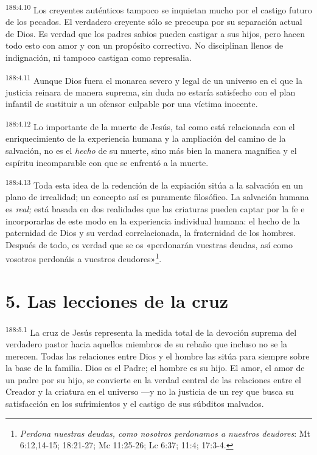 \par 
\textsuperscript{188:4.10} Los creyentes auténticos tampoco se inquietan mucho por el castigo futuro de los pecados. El verdadero creyente sólo se preocupa por su separación actual de Dios. Es verdad que los padres sabios pueden castigar a sus hijos, pero hacen todo esto con amor y con un propósito correctivo. No disciplinan llenos de indignación, ni tampoco castigan como represalia.

\par 
\textsuperscript{188:4.11} Aunque Dios fuera el monarca severo y legal de un universo en el que la justicia reinara de manera suprema, sin duda no estaría satisfecho con el plan infantil de sustituir a un ofensor culpable por una víctima inocente.

\par 
\textsuperscript{188:4.12} Lo importante de la muerte de Jesús, tal como está relacionada con el enriquecimiento de la experiencia humana y la ampliación del camino de la salvación, no es el \textit{hecho} de su muerte, sino más bien la manera magnífica y el espíritu incomparable con que se enfrentó a la muerte.

\par 
\textsuperscript{188:4.13} Toda esta idea de la redención de la expiación sitúa a la salvación en un plano de irrealidad; un concepto así es puramente filosófico. La salvación humana es \textit{real;} está basada en dos realidades que las criaturas pueden captar por la fe e incorporarlas de este modo en la experiencia individual humana: el hecho de la paternidad de Dios y su verdad correlacionada, la fraternidad de los hombres. Después de todo, es verdad que se os «perdonarán vuestras deudas, así como vosotros perdonáis a vuestros deudores»\footnote{\textit{Perdona nuestras deudas, como nosotros perdonamos a nuestros deudores}: Mt 6:12,14-15; 18:21-27; Mc 11:25-26; Lc 6:37; 11:4; 17:3-4.}.

\section*{5. Las lecciones de la cruz}
\par 
\textsuperscript{188:5.1} La cruz de Jesús representa la medida total de la devoción suprema del verdadero pastor hacia aquellos miembros de su rebaño que incluso no se la merecen. Todas las relaciones entre Dios y el hombre las sitúa para siempre sobre la base de la familia. Dios es el Padre; el hombre es su hijo. El amor, el amor de un padre por su hijo, se convierte en la verdad central de las relaciones entre el Creador y la criatura en el universo ---y no la justicia de un rey que busca su satisfacción en los sufrimientos y el castigo de sus súbditos malvados.

